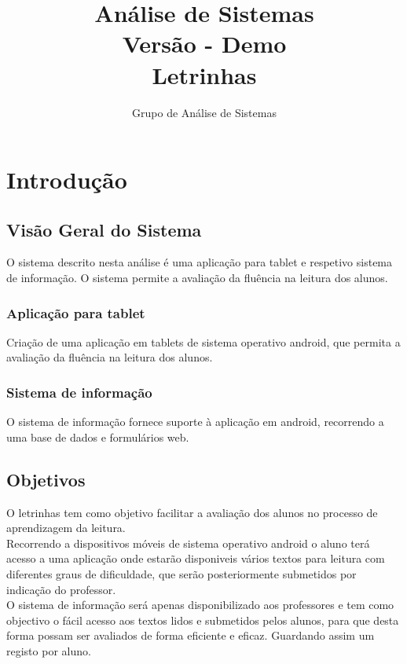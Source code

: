 \documentclass[a4paper,titlepage]{article}
\title{Análise de Sistemas\\ Versão - Demo  \\ Letrinhas}
\author{Grupo de Análise de Sistemas}
\begin{document}
	\maketitle %
	\newpage
	\tableofcontents %
	\newpage %

	 \section{Introdução}%
		\subsection{Visão Geral do Sistema}
		 O sistema descrito nesta análise é uma aplicação para tablet e respetivo sistema de informação. O sistema permite a avaliação da fluência na leitura dos alunos. 
		 	\subsubsection{Aplicação para tablet}
			Criação de uma aplicação em tablets de sistema operativo android, que permita a avaliação da fluência na leitura dos alunos.  
			
			\subsubsection{Sistema de informação}
			O sistema de informação fornece suporte à aplicação em android, recorrendo a uma base de dados e formulários web.
				
		\subsection{Objetivos}
			O letrinhas tem como objetivo facilitar a avaliação dos alunos no processo de aprendizagem da leitura.\\
			
			 Recorrendo a dispositivos móveis de sistema operativo android o aluno terá acesso a uma aplicação onde estarão disponiveis vários textos para leitura com diferentes graus de dificuldade, que serão posteriormente submetidos por indicação do professor.\\
			 
			  O sistema de informação será apenas disponibilizado aos professores e tem como objectivo o fácil acesso aos textos lidos e submetidos pelos alunos, para que desta forma possam ser avaliados de forma eficiente e eficaz. Guardando assim um registo por aluno.
			
		
		
		
		
		
\end{document}
